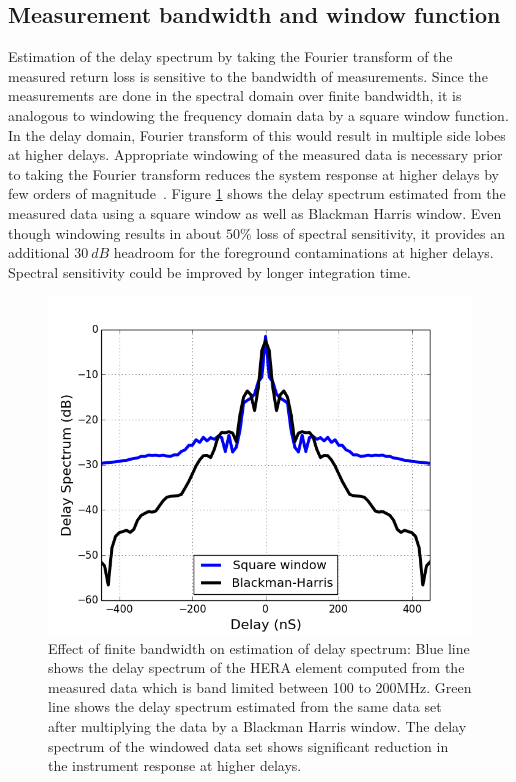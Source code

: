 \documentclass[twocolumn]{emulateapj}
\begin{document}
    \subsection{Measurement bandwidth and window function}
    
    Estimation of the delay spectrum by taking the Fourier transform of the
    measured return loss is sensitive to the bandwidth of measurements. Since the
    measurements are done in the spectral domain over finite bandwidth, it is analogous
     to windowing the frequency domain data by a square
    window function. In the delay domain, Fourier transform of this would result in
    multiple side lobes at higher delays. Appropriate windowing of the
    measured data is necessary prior to taking the Fourier transform reduces
    the system response at higher delays by few orders of magnitude~\citep{nithya_et_al2013}.
    Figure \ref{fig:window} shows the delay spectrum estimated from the measured
    data using a square window as well as Blackman Harris window. Even though windowing 
    results in about $50\%$ loss of spectral sensitivity, it provides an additional $30~dB$ headroom 
    for the foreground contaminations at higher delays. Spectral sensitivity could be improved by longer integration
    time.     
    \begin{figure}
    \centering
    \includegraphics[width=\linewidth]{GB_reflectometry_part3/plot/ds_window.png}
    \caption{Effect of finite bandwidth on estimation of delay spectrum: Blue line shows the delay spectrum of the HERA element computed from the measured data which is band limited between 100 to 200MHz. Green line shows the delay spectrum estimated from the same data set after multiplying the data by a Blackman Harris window. The delay spectrum of the windowed data set shows significant reduction in the instrument response at higher delays.}
    \label{fig:window}
    \end{figure} 
    
\end{document}
